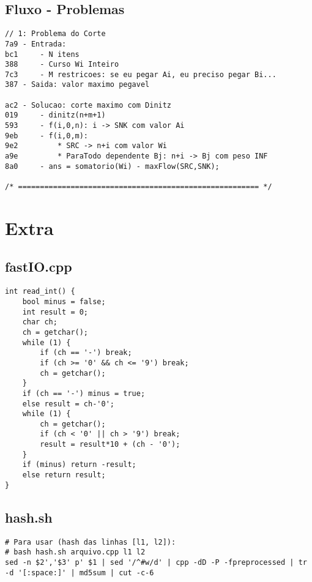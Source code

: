 \documentclass[11pt, a4paper, twoside]{article}
\begin{document}
\subsection{Fluxo - Problemas}
\begin{lstlisting}
// 1: Problema do Corte
7a9 - Entrada:
bc1 	- N itens
388 	- Curso Wi Inteiro
7c3 	- M restricoes: se eu pegar Ai, eu preciso pegar Bi...
387 - Saida: valor maximo pegavel

ac2 - Solucao: corte maximo com Dinitz
019 	- dinitz(n+m+1)
593 	- f(i,0,n): i -> SNK com valor Ai
9eb 	- f(i,0,m):
9e2 		* SRC -> n+i com valor Wi
a9e 		* ParaTodo dependente Bj: n+i -> Bj com peso INF
8a0 	- ans = somatorio(Wi) - maxFlow(SRC,SNK);

/* ======================================================= */
\end{lstlisting}

\pagebreak


%
%

\section{Extra}

\subsection{fastIO.cpp}
\begin{lstlisting}
int read_int() {
    bool minus = false;
    int result = 0;
    char ch;
    ch = getchar();
    while (1) {
        if (ch == '-') break;
        if (ch >= '0' && ch <= '9') break;
        ch = getchar();
    }
    if (ch == '-') minus = true;
    else result = ch-'0';
    while (1) {
        ch = getchar();
        if (ch < '0' || ch > '9') break;
        result = result*10 + (ch - '0');
    }
    if (minus) return -result;
    else return result;
}
\end{lstlisting}

\subsection{hash.sh}
\begin{lstlisting}
# Para usar (hash das linhas [l1, l2]):
# bash hash.sh arquivo.cpp l1 l2
sed -n $2','$3' p' $1 | sed '/^#w/d' | cpp -dD -P -fpreprocessed | tr -d '[:space:]' | md5sum | cut -c-6
\end{lstlisting}
\end{document}
